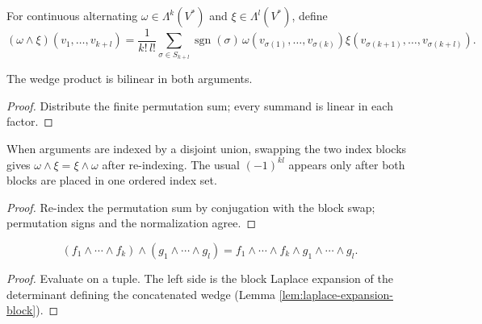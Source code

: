 \begin{definition}
\label{def:wedge-alternating-forms}
\leanok
For continuous alternating $\omega\in\Lambda^k(V^*)$ and $\xi\in\Lambda^l(V^*)$, define
\[
(\omega\wedge\xi)(v_1,\ldots,v_{k+l})=\frac1{k!\,l!}\sum_{\sigma\in S_{k+l}}\operatorname{sgn}(\sigma)\,\omega(v_{\sigma(1)},\ldots,v_{\sigma(k)})\xi(v_{\sigma(k+1)},\ldots,v_{\sigma(k+l)}).
\]
\end{definition}

\begin{lemma}
\label{lem:wedge-bilinear}
\leanok
{}
The wedge product is bilinear in both arguments.
\end{lemma}
\begin{proof}
\leanok
\sketch Distribute the finite permutation sum; every summand is linear in each factor.
\end{proof}

\begin{lemma}
\label{lem:wedge-comm-sum}
\leanok
{}
When arguments are indexed by a disjoint union, swapping the two index blocks gives $\omega\wedge\xi=\xi\wedge\omega$ after re-indexing. The usual $(-1)^{kl}$ appears only after both blocks are placed in one ordered index set.
\end{lemma}
\begin{proof}
\leanok
\sketch Re-index the permutation sum by conjugation with the block swap; permutation signs and the normalization agree.
\end{proof}

\begin{lemma}
\label{lem:wedge-covectors-concat}
\leanok
{}
\[
(f_1\wedge\cdots\wedge f_k)\wedge(g_1\wedge\cdots\wedge g_l)=f_1\wedge\cdots\wedge f_k\wedge g_1\wedge\cdots\wedge g_l.
\]
\end{lemma}
\begin{proof}
\leanok
{}
\sketch Evaluate on a tuple. The left side is the block Laplace expansion of the determinant defining the concatenated wedge (Lemma \ref{lem:laplace-expansion-block}).
\end{proof}

